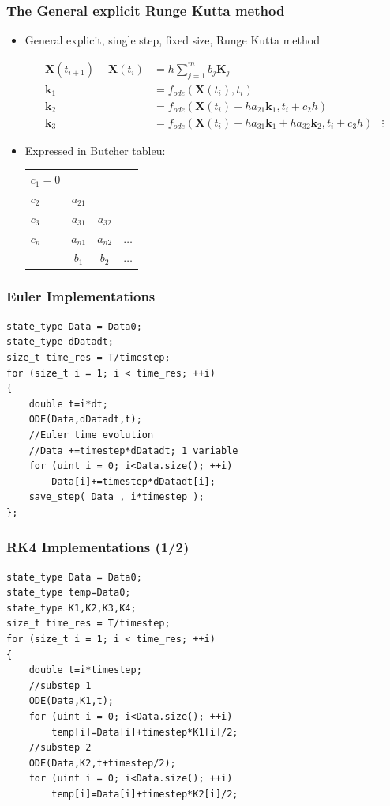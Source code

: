 \documentclass{beamer}
\begin{document}
\begin{frame}
\frametitle{The General explicit Runge Kutta method}
\begin{itemize}

\item<1-> General explicit, single step, fixed size, Runge Kutta method

\begin{align*}
\mathbf{X}(t_{i+1})-\mathbf{X}(t_{i}) &=  h \sum_{j=1}^{m} b_j \mathbf{K}_j\\
\mathbf{k}_1 &= f_{ode}(\mathbf{X}(t_i),t_i)\\
\mathbf{k}_2 &= f_{ode}(\mathbf{X}(t_i)+ha_{21} \mathbf{k}_1,t_i+c_2 h)\\
\mathbf{k}_3 &= f_{ode}(\mathbf{X}(t_i)+ha_{31} \mathbf{k}_1+ha_{32} \mathbf{k}_2,t_i+c_3 h)
&\vdots
\end{align*}

\item<2-> Expressed in Butcher tableu:

\begin{tabular}{l | @{\quad} c @{\quad} c @{\quad} c}
$c_1=0$ \\
$c_2$ & $a_{21}$\\
$c_3$ & $a_{31}$ &  $a_{32}$\\
$c_n$ & $a_{n1}$ &  $a_{n2}$ & $\hdots$\\
\midrule
& $b_1$ & $b_2$ & $\hdots$
\end{tabular}


\end{itemize}
\end{frame}


\begin{frame}[fragile]
\frametitle{Euler Implementations}
\begin{lstlisting}
state_type Data = Data0;
state_type dDatadt;
size_t time_res = T/timestep;
for (size_t i = 1; i < time_res; ++i)
{
    double t=i*dt;
    ODE(Data,dDatadt,t);
    //Euler time evolution
    //Data +=timestep*dDatadt; 1 variable
    for (uint i = 0; i<Data.size(); ++i)
        Data[i]+=timestep*dDatadt[i];
    save_step( Data , i*timestep );
};
\end{lstlisting}
\end{frame}





\begin{frame}[fragile]
\frametitle{RK4 Implementations (1/2)}
\begin{lstlisting}
state_type Data = Data0;
state_type temp=Data0;
state_type K1,K2,K3,K4;
size_t time_res = T/timestep;
for (size_t i = 1; i < time_res; ++i)
{
    double t=i*timestep;
    //substep 1
    ODE(Data,K1,t);
    for (uint i = 0; i<Data.size(); ++i)
        temp[i]=Data[i]+timestep*K1[i]/2;
    //substep 2
    ODE(Data,K2,t+timestep/2);
    for (uint i = 0; i<Data.size(); ++i)
        temp[i]=Data[i]+timestep*K2[i]/2;
\end{lstlisting}
\end{frame}
\end{document}
